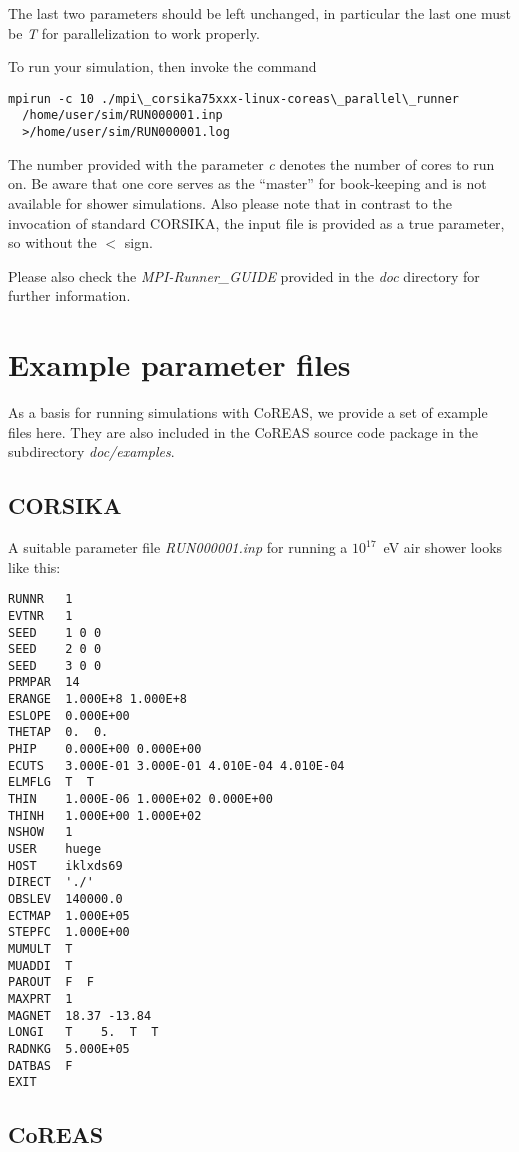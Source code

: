 \documentclass[a4paper,10pt]{article}
\begin{document}
The last two parameters should be left unchanged, in particular the last one must be {\em T} for parallelization to work properly.

To run your simulation, then invoke the command
%
\begin{verbatim}
mpirun -c 10 ./mpi\_corsika75xxx-linux-coreas\_parallel\_runner
  /home/user/sim/RUN000001.inp
  >/home/user/sim/RUN000001.log
\end{verbatim}
%
The number provided with the parameter {\em c} denotes the number of cores to run on. Be aware that one core serves as the ``master'' for book-keeping and is not available for shower simulations. Also please note that in contrast to the invocation of standard CORSIKA, the input file is provided as a true parameter, so without the $<$ sign.

Please also check the {\em MPI-Runner\_GUIDE} provided in the {\em doc} directory for further information.

\section{Example parameter files} \label{sec:examplefiles}

As a basis for running simulations with CoREAS, we provide a set of example files here. They are also included in the CoREAS source code package in the subdirectory {\it doc/examples}.

\subsection{CORSIKA}

A suitable parameter file {\it RUN000001.inp} for running a $10^{17}$~eV air shower looks like this:
%
\begin{verbatim}
RUNNR   1
EVTNR   1
SEED    1 0 0
SEED    2 0 0
SEED    3 0 0
PRMPAR  14
ERANGE  1.000E+8 1.000E+8
ESLOPE  0.000E+00
THETAP  0.  0.
PHIP    0.000E+00 0.000E+00
ECUTS   3.000E-01 3.000E-01 4.010E-04 4.010E-04
ELMFLG  T  T
THIN    1.000E-06 1.000E+02 0.000E+00
THINH   1.000E+00 1.000E+02
NSHOW   1
USER    huege
HOST    iklxds69
DIRECT  './'
OBSLEV  140000.0
ECTMAP  1.000E+05
STEPFC  1.000E+00
MUMULT  T
MUADDI  T
PAROUT  F  F
MAXPRT  1
MAGNET  18.37 -13.84
LONGI   T    5.  T  T
RADNKG  5.000E+05
DATBAS  F
EXIT
\end{verbatim}

\subsection{CoREAS}
\end{document}
